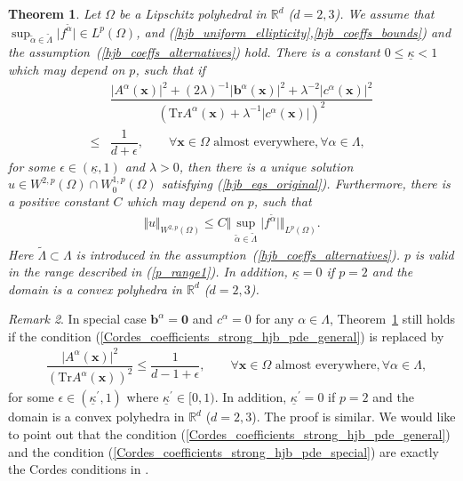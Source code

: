 \documentclass[12pt]{amsart}
\newcommand{\boldx}{\boldsymbol{x}}
\newtheorem{theorem}{Theorem}[section]
\theoremstyle{definition}
\theoremstyle{remark}
\newtheorem{remark}[theorem]{Remark}
\begin{document}
\begin{theorem}
\label{thm_hjb_pde_wellposedness}
Let $\Omega$ be a Lipschitz polyhedral in $\mathbb{R}^{d}$ ($d=2,3$). 
We assume that $\sup_{\tilde{\alpha} \in \tilde{\Lambda}}\vert f^{\tilde{\alpha}} 
\vert \in L^{p}(\Omega)$, and (\ref{hjb_uniform_ellipticity},\ref{hjb_coeffs_bounds}) 
and the assumption~(\ref{hjb_coeffs_alternatives}) hold.  
There is a constant $0\leq \underline{\kappa}<1$ 
which may depend on $p$, such that if 
\begin{align}
\label{Cordes_coefficients_strong_hjb_pde_general}
& \dfrac{ \vert A^{\alpha}(\boldx)\vert^{2} 
+ (2\lambda)^{-1}\vert \boldsymbol{b}^{\alpha}(\boldx)\vert^{2} 
+ \lambda^{-2}\vert c^{\alpha}(\boldx)\vert^{2}}{\left( 
\text{Tr}A^{\alpha}(\boldx) + \lambda^{-1}
\vert c^{\alpha}(\boldx)\vert\right)^{2}} \\
\nonumber 
\leq & \dfrac{1}{d+ \epsilon}, \qquad
\forall \boldx \in \Omega \text{ almost everywhere},
\forall \alpha \in \Lambda,
\end{align}
for some $\epsilon \in (\underline{\kappa},1)$ and $\lambda > 0$,
then there is a unique solution $u \in W^{2,p}(\Omega)
\cap W_{0}^{1,p}(\Omega)$ satisfying (\ref{hjb_eqs_original}). 
Furthermore, there is a positive constant $C$ which may depend on $p$, such that
\begin{align*}
\Vert u\Vert_{W^{2,p}(\Omega)} \leq C \Vert \sup_{\tilde{\alpha}
\in \tilde{\Lambda}}\vert f^{\tilde{\alpha}}\vert\Vert_{L^{p}(\Omega)}.
\end{align*}
Here $\tilde{\Lambda}\subset \Lambda$ is introduced in 
the assumption~(\ref{hjb_coeffs_alternatives}). 
$p$ is valid in the range described in (\ref{p_range1}). 
In addition, $\underline{\kappa} = 0$ if $p=2$ and 
the domain is a convex polyhedra in $\mathbb{R}^{d}$ ($d=2,3$).
\end{theorem}

\begin{remark}
\label{remark_hjb_pde_wellposedness}
In special case $\boldsymbol{b}^{\alpha} = \boldsymbol{0}$ and $c^{\alpha} = 0$ 
for any $\alpha \in \Lambda$, Theorem~\ref{thm_hjb_pde_wellposedness} still holds 
if the condition (\ref{Cordes_coefficients_strong_hjb_pde_general}) is replaced by 
\begin{align}
\label{Cordes_coefficients_strong_hjb_pde_special}
& \dfrac{\vert A^{\alpha}(\boldx)\vert^{2}}{\left( 
\text{Tr}A^{\alpha}(\boldx) \right)^{2}} 
\leq \dfrac{1}{d -1 + \epsilon}, \qquad
\forall \boldx \in \Omega \text{ almost everywhere},
\forall \alpha \in \Lambda,
\end{align}
for some $\epsilon \in (\underline{\kappa}^{\prime},1)$ 
where $\underline{\kappa}^{\prime} \in [0,1)$. 
In addition, $\underline{\kappa}^{\prime} = 0$ if $p=2$ and 
the domain is a convex polyhedra in $\mathbb{R}^{d}$ ($d=2,3$).
The proof is similar.
We would like to point out that the condition (\ref{Cordes_coefficients_strong_hjb_pde_general}) 
and the condition (\ref{Cordes_coefficients_strong_hjb_pde_special}) are exactly 
the Cordes conditions in \cite{SmearsSuli2014}.
\end{remark}
\end{document}
